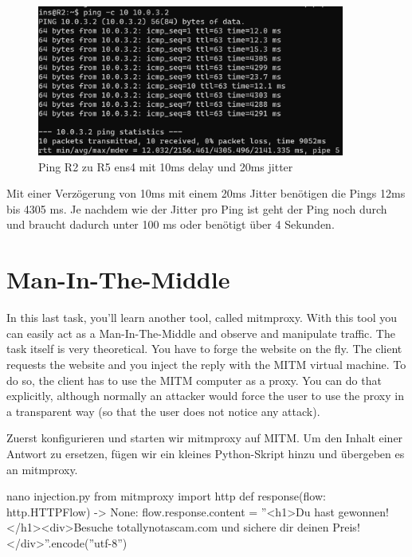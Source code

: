 \documentclass[11pt,titlepage]{article}
\newenvironment{shadedquotation}
 {\begin{shaded*}
  \quoting[leftmargin=0pt, vskip=0pt]
 }
 {\endquoting
 \end{shaded*}
}
\begin{document}
\begin{figure}[H]
  \begin{center}
  	\includegraphics[width=0.90\textwidth]{"images/Ping R2 to R5 10ms delay 20ms jitter"}
  	\caption{Ping R2 zu R5 ens4 mit 10ms delay und 20ms jitter}
  	\label{fig:Ping-R2-to-R5-10ms-delay-20ms-jitter}
  \end{center}
\end{figure}

Mit einer Verzögerung von 10ms mit einem 20ms Jitter benötigen die Pings 12ms bis 4305 ms. Je nachdem wie der Jitter pro Ping ist geht der Ping noch durch und braucht dadurch unter 100 ms oder benötigt über 4 Sekunden.

\section{Man-In-The-Middle}
\begin{shadedquotation}
	In this last task, you’ll learn another tool, called mitmproxy. With this tool you can easily act
	as a Man-In-The-Middle and observe and manipulate traffic. The task itself is very theoretical.
	You have to forge the website on the fly. The client requests the website and you inject the reply
	with the MITM virtual machine. To do so, the client has to use the MITM computer as a proxy.
	You can do that explicitly, although normally an attacker would force the user to use the proxy
	in a transparent way (so that the user does not notice any attack).
\end{shadedquotation}
Zuerst konfigurieren und starten wir mitmproxy auf MITM.
Um den Inhalt einer Antwort zu ersetzen, fügen wir ein kleines Python-Skript hinzu und übergeben es an mitmproxy.
\begin{shadedquotation}
	nano injection.py
	from mitmproxy import http
	def response(flow: http.HTTPFlow) -> None:
	flow.response.content = ''<h1>Du hast gewonnen!</h1><div>Besuche totallynotascam.com und sichere dir deinen Preis!</div>''.encode(''utf-8'')
	
\end{shadedquotation}
\end{document}
